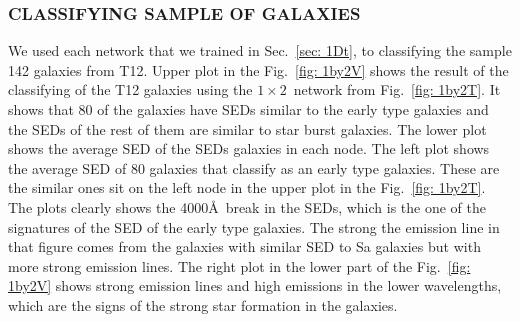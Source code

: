         \subsubsection{ CLASSIFYING SAMPLE OF GALAXIES}
            We used each network that we trained in Sec.~\ref{sec: 1Dt}, to classifying the sample 142 galaxies from T12.
            Upper plot in the Fig.~\ref{fig: 1by2V} shows the result of the classifying of the T12 galaxies using the $1 \times 2$~network from Fig.~\ref{fig: 1by2T}.
            It shows that 80 of the galaxies have SEDs similar to the early type galaxies and the SEDs of the rest of them are similar to star burst galaxies.
            The lower plot shows the average SED of the SEDs galaxies in each node. 
            The left plot shows the average SED of 80 galaxies that classify as an early type galaxies. 
            These are the similar ones sit on the left node in the upper plot in the Fig.~\ref{fig: 1by2T}.
            The plots clearly shows the 4000\AA~break in the SEDs, which is the one of the signatures of the SED of the early type galaxies.
            The strong the emission line in that figure comes from the galaxies with similar SED to Sa galaxies but with more strong emission lines.
            The right plot in the lower part of the Fig.~\ref{fig: 1by2V} shows strong emission lines and high emissions in the lower wavelengths, which are the signs of the strong star formation in the galaxies. 
